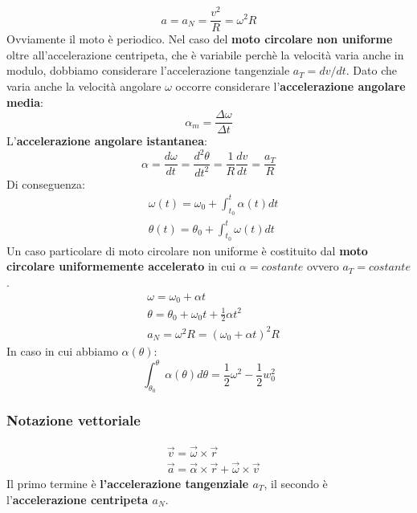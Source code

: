\documentclass{article}
\numberwithin{equation}{subsection}
\begin{document}
  \begin{equation}
      a=a_N=\frac{v^2}{R}=\omega^2R
  \end{equation}
  Ovviamente il moto è periodico. Nel caso del \textbf{moto circolare non uniforme} oltre all'accelerazione centripeta, che è variabile perchè la velocità varia anche in modulo, dobbiamo considerare l'accelerazione tangenziale $a_T= dv/dt$. Dato che varia anche la velocità angolare $\omega$ occorre considerare l'\textbf{accelerazione angolare media}:
  \begin{equation}
      \alpha_m=\frac{\Delta \omega}{\Delta t}
  \end{equation}
  L'\textbf{accelerazione angolare istantanea}:
  \begin{equation}
      \alpha=\frac{d \omega}{dt}=\frac{d^2 \theta}{dt^2}=\frac{1}{R}\frac{dv}{dt}=\frac{a_T}{R}
  \end{equation}
  Di conseguenza:
  \begin{align}
      & \omega (t)= \omega_0 + \int_{t_0}^t \alpha(t) dt \\
      & \theta (t)= \theta_0 + \int_{t_0}^t \omega(t) dt
  \end{align}
  Un caso particolare di moto circolare non uniforme è costituito dal \textbf{moto circolare uniformemente accelerato} in cui $\alpha = costante$ ovvero $a_T=costante$.
  \begin{align}
      & \omega = \omega_0 + \alpha t \\
      & \theta = \theta_0 + \omega_0t + \frac{1}{2}\alpha t^2 \\
      & a_N = \omega^2R=(\omega_0+\alpha t)^2R
  \end{align}
  In caso in cui abbiamo $\alpha (\theta)$:
  \begin{equation}
      \int_{\theta_0}^\theta \alpha(\theta)d\theta= \frac{1}{2}\omega^2-\frac{1}{2}w_0^2
  \end{equation}
  \subsubsection{Notazione vettoriale}
  \begin{align}
      &  \vec{v}= \vec{\omega} \times \vec{r} \\
      &  \vec{a} = \vec{\alpha} \times \vec{r} + \vec{\omega} \times \vec{v}
  \end{align}
Il primo termine è \textbf{l'accelerazione tangenziale $a_T$}, il secondo è l'\textbf{accelerazione centripeta $a_N$}.
\end{document}
